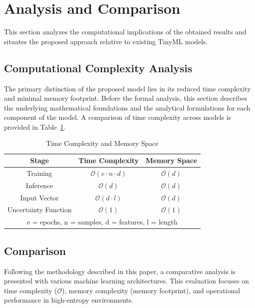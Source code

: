 \documentclass[conference]{IEEEtran}
\begin{document}
\section{Analysis and Comparison}

This section analyzes the computational implications of the obtained results and situates the proposed approach relative to existing TinyML models.

\subsection{Computational Complexity Analysis}

The primary distinction of the proposed model lies in its reduced time complexity and minimal memory footprint. Before the formal analysis, this section describes the underlying mathematical foundations and the analytical formulations for each component of the model. A comparison of time complexity across models is provided in Table~\ref{tab:Mathematical-Analysis}.

\begin{table}[H]
    \centering
    \caption{Time Complexity and Memory Space}
    \label{tab:Mathematical-Analysis}
    \begin{tabular}{c c c}
        \hline
        Stage & Time Complexity & Memory Space\\
        \hline
        Training & $\mathcal{O}(e \cdot n \cdot d)$ & $\mathcal{O}(d)$\\
        Inference & $\mathcal{O}(d)$ & $\mathcal{O}(d)$\\
        Input Vector & $\mathcal{O}(d \cdot l)$ & $\mathcal{O}(d)$\\
        Uncertainty Function & $\mathcal{O}(1)$ & $\mathcal{O}(1)$\\
        \hline
        \multicolumn{3}{p{0.9\linewidth}}{\centering
        e = epochs, n = samples, d = features, l = length
        }
    \end{tabular}
\end{table}

\subsection{Comparison}

Following the methodology described in this paper, a comparative analysis is presented with various machine learning architectures. This evaluation focuses on time complexity ($\mathcal{O}$), memory complexity (memory footprint), and operational performance in high-entropy environments.
\end{document}
